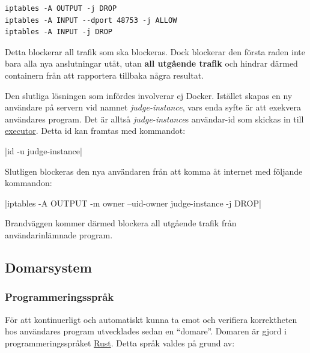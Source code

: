 \documentclass{article}
\begin{document}
\begin{verbatim}
iptables -A OUTPUT -j DROP
iptables -A INPUT --dport 48753 -j ALLOW
iptables -A INPUT -j DROP
\end{verbatim}


Detta blockerar all trafik som ska blockeras. Dock blockerar den första raden
inte bara alla nya anslutningar utåt, utan \textbf{all utgående trafik} och
hindrar därmed containern från att rapportera tillbaka några resultat.

Den slutliga lösningen som infördes involverar ej Docker. Istället skapas
en ny användare på servern vid namnet \textit{judge-instance}, vars enda
syfte är att exekvera användares program. Det är alltså \textit{judge-instance}s
användar-id som skickas in till \hyperlink{executor}{executor}.
Detta id kan framtas med kommandot:

|id -u judge-instance|

Slutligen blockeras den nya användaren från att komma åt internet med följande
kommandon:

|iptables -A OUTPUT -m owner --uid-owner judge-instance -j DROP|

Brandväggen kommer därmed blockera all utgående trafik från användarinlämnade
program.

\subsection{Domarsystem}

\subsubsection{Programmeringsspråk}

För att kontinuerligt och automatiskt kunna ta emot och verifiera korrektheten
hos användares program utvecklades sedan en ``domare''. Domaren är gjord i
programmeringsspråket \href{https://rust-lang.org}{Rust}. Detta språk valdes på
grund av:
\end{document}
